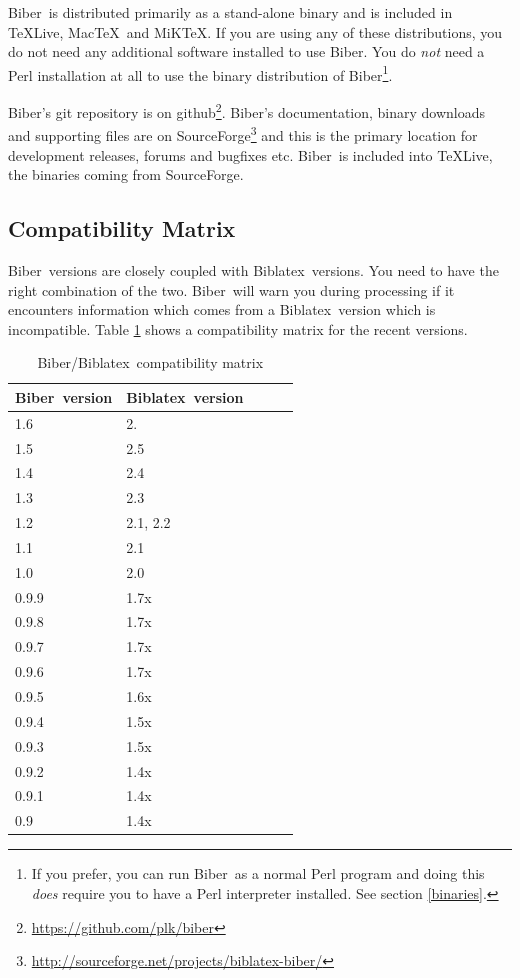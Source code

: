 \documentclass{ltxdockit}
\newcommand*{\biber}{Biber\xspace}
\newcommand*{\biblatex}{Biblatex\xspace}
\begin{document}
\biber\ is distributed primarily as a stand-alone binary and is
included in \TeX Live, Mac\TeX\ and MiK\TeX. If you are using any of these
distributions, you do not need any additional software installed to use
\biber. You do \emph{not} need a Perl installation at all to use
the binary distribution of \biber\footnote{If you prefer, you can run
\biber\ as a normal Perl program and doing this \emph{does} require
you to have a Perl interpreter installed. See section \ref{binaries}.}.

\biber's git repository is on
github\footnote{\url{https://github.com/plk/biber}}. \biber's documentation,
binary downloads and supporting files are on
SourceForge\footnote{\url{http://sourceforge.net/projects/biblatex-biber/}}
and this is the primary location for development releases, forums and
bugfixes etc. \biber\ is included into \TeX Live, the binaries coming from
SourceForge.

\subsection{Compatibility Matrix}

\biber\ versions are closely coupled with \biblatex\ versions. You
need to have the right combination of the two. \biber\ will warn you
during processing if it encounters information which comes from a
\biblatex\ version which is incompatible. Table \ref{tab:compat} shows a
compatibility matrix for the recent versions.

\begin{table}
\begin{center}
\small
\begin{tabular}{lllll}
\toprule
\biber\ version & \biblatex\ version\\
\midrule
1.6 & 2.\\
1.5 & 2.5\\
1.4 & 2.4\\
1.3 & 2.3\\
1.2 & 2.1, 2.2\\
1.1 & 2.1\\
1.0 & 2.0\\
0.9.9 & 1.7x\\
0.9.8 & 1.7x\\
0.9.7 & 1.7x\\
0.9.6 & 1.7x\\
0.9.5 & 1.6x\\
0.9.4 & 1.5x\\
0.9.3 & 1.5x\\
0.9.2 & 1.4x\\
0.9.1 & 1.4x\\
0.9 & 1.4x\\
\bottomrule
\end{tabular}
\end{center}
\caption{\biber/\biblatex\ compatibility matrix}
\label{tab:compat}
\end{table}
\end{document}
